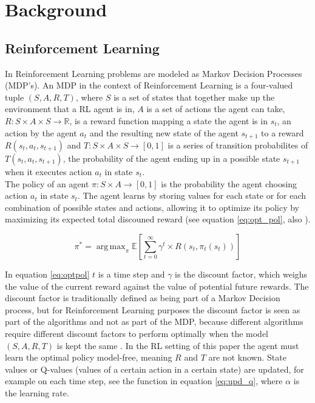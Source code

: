 
\section{Background}

\subsection{Reinforcement Learning}

In Reinforcement Learning problems are modeled as Markov Decision Processes (MDP's). An MDP in the context of Reinforcement Learning
is a four-valued tuple $(S,A,R,T)$, where $S$ is a set of states that together make up the environment that a RL agent is in,
 $A$ is a set of actions the agent can take, $R: S \times A \times S \rightarrow \mathbb{R}$, is a reward function mapping a state the agent is in $s_t$,
 an action by the agent $a_t$ and the resulting new state of the agent $s_{t+1}$ to a reward $R(s_t,a_t,s_{t+1})$
 and $T: S \times A \times S \rightarrow [0,1]$ is a series of transition probabilites of $T(s_t,a_t,s_{t+1})$, the probability of the agent
 ending up in a possible state $s_{t+1}$ when it executes action $a_t$ in state $s_t$. \\
 The policy of an agent $\pi: S \times A \rightarrow [0,1]$ is the probability the agent choosing action $a_t$ in state $s_t$. The agent learns by storing values for each
 state or for each combination of possible states and actions, allowing it to optimize its policy by maximizing its expected total discouned reward
 (see equation \ref{eq:opt_pol}, also \cite{zimmer2016neural}).

\begin{equation}
\label{eq:opt_pol}
\pi^* = \operatorname{arg\,max}_{\pi} \mathbb{E}\left [ \sum_{t = 0}^{\infty}\gamma^{t} \times R(s_t,\pi_t(s_t))\right ]
\end{equation}

In equation \eqref{eq:optpol} $t$ is a time step and $\gamma$ is the discount factor, which weighs the value of the current reward against the value of potential future rewards.
The discount factor is traditionally defined as being part of a Markov Decision process, but for Reinforcement Learning purposes the discount factor is seen as part
of the algorithms and not as part of the MDP, because different algorithms require different discount factors to perform optimally when the model
$(S,A,R,T)$ is kept the same \cite{van2007reinforcement}. In the RL setting of this paper the agent must learn the optimal policy model-free, meaning $R$ and $T$ are not known.
State values or Q-values (values of a certain action in a certain state) are updated, for example on each time step, see the function in equation \ref{eq:upd_q}, where $\alpha$ is the learning rate.

